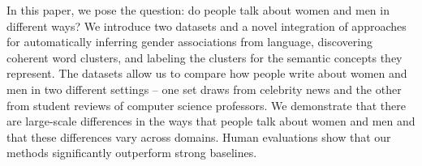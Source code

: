 In this paper, we pose the question: do people talk about women and men in different ways? We introduce two datasets and a novel integration of approaches for automatically inferring gender associations from language, discovering coherent word clusters, and labeling the clusters for the semantic concepts they represent. The datasets allow us to compare how people write about women and men in two different settings -- one set draws from celebrity news and the other from student reviews of computer science professors. We demonstrate that there are large-scale differences in the ways that people talk about women and men and that these differences vary across domains. Human evaluations show that our methods significantly outperform strong baselines.